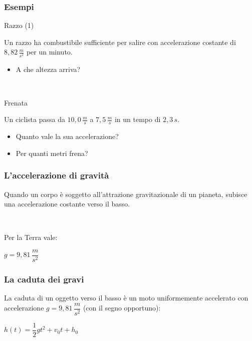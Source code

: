 \documentclass[]{beamer}
\theoremstyle{plain}
\begin{document}
\begin{frame}
\frametitle{Esempi}
\begin{exampleblock}{Razzo (1)}
\begin{small}
Un razzo ha combustibile sufficiente per salire con accelerazione costante di $ 8,82 \, \frac{m}{s^2} $ per un minuto.
\begin{itemize}
  \item A che altezza arriva?
\end{itemize}
\end{small}
\end{exampleblock}

~


\begin{exampleblock}{Frenata}
\begin{small}
Un ciclista passa da $ 10,0 \, \frac{m}{s} $ a $ 7,5 \, \frac{m}{s} $ in un tempo di $ 2,3 \, s $.
\begin{itemize}
  \item Quanto vale la sua accelerazione?
  \item Per quanti metri frena?
\end{itemize}
\end{small}
\end{exampleblock}

\end{frame}



\begin{frame}
\frametitle{L'accelerazione di gravità}
Quando un corpo è soggetto all'attrazione gravitazionale di un pianeta, subisce una \alert{accelerazione costante verso il basso}.\pause

~

Per la Terra vale:
\begin{center}
\colorbox{blue!30}{$ g = 9,81 \, \dfrac{m}{s^2} $}
\end{center}  
\end{frame}

\begin{frame}
\frametitle{La caduta dei gravi}
La caduta di un oggetto verso il basso è un moto uniformemente accelerato con accelerazione $ g = 9,81 \, \dfrac{m}{s^2} $ (con il segno opportuno):
\begin{center}
\colorbox{blue!30}{$ h(t) = \dfrac{1}{2} gt^2 + v_0 t + h_0 $}
\end{center}
\end{frame}
\end{document}
